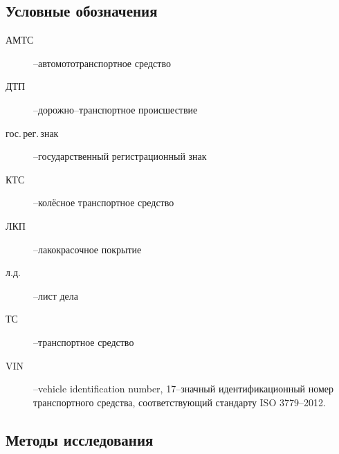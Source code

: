 \subsection{Условные обозначения}

\begin{description}
%	 
\item[АМТС] --автомототранспортное средство
\item[ДТП] --дорожно--транспортное происшествие
\item[гос.\,рег.\,знак] --государственный регистрационный знак
\item[КТС] --колёсное транспортное средство 
\item[ЛКП] --лакокрасочное покрытие
\item[л.д.] --лист дела
\item[ТС] --транспортное средство
\item[VIN] --vehicle identification number, 17--значный идентификационный номер транспортного средства, соответствующий стандарту ISO 3779--2012.
%
\end{description}

\subsection{Методы исследования}

